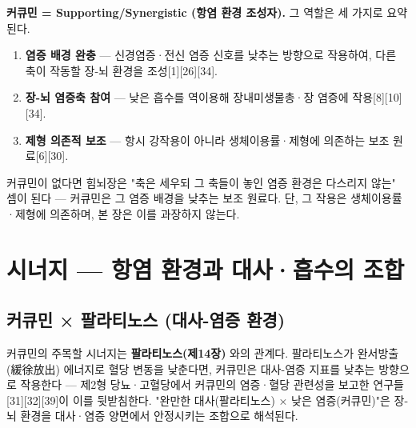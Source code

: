 \documentclass[11pt,oneside]{book}
\begin{document}
\vspace{2pt}\vspace{3pt}

\textbf{커큐민 = Supporting/Synergistic (항염 환경 조성자).} 그 역할은 세 가지로 요약된다.

\begin{enumerate}[leftmargin=6mm,itemsep=1pt,topsep=2pt]
  \item \textbf{염증 배경 완충} — 신경염증·전신 염증 신호를 낮추는 방향으로 작용하여, 다른 축이 작동할 장-뇌 환경을 조성[1][26][34].
  \item \textbf{장-뇌 염증축 참여} — 낮은 흡수를 역이용해 장내미생물총·장 염증에 작용[8][10][34].
  \item \textbf{제형 의존적 보조} — 항시 강작용이 아니라 생체이용률·제형에 의존하는 보조 원료[6][30].
\end{enumerate}
커큐민이 없다면 힘뇌장은 "축은 세우되 그 축들이 놓인 염증 환경은 다스리지 않는" 셈이 된다 — 커큐민은 그 염증 배경을 낮추는 보조 원료다. 단, 그 작용은 생체이용률·제형에 의존하며, 본 장은 이를 과장하지 않는다.

\section{시너지 — 항염 환경과 대사·흡수의 조합}
\subsection{커큐민 × 팔라티노스 (대사-염증 환경)}
커큐민의 주목할 시너지는 \textbf{팔라티노스(제14장)} 와의 관계다. 팔라티노스가 완서방출(緩徐放出) 에너지로 혈당 변동을 낮춘다면, 커큐민은 대사-염증 지표를 낮추는 방향으로 작용한다 — 제2형 당뇨·고혈당에서 커큐민의 염증·혈당 관련성을 보고한 연구들[31][32][39]이 이를 뒷받침한다. "완만한 대사(팔라티노스) × 낮은 염증(커큐민)"은 장-뇌 환경을 대사·염증 양면에서 안정시키는 조합으로 해석된다.
\end{document}
